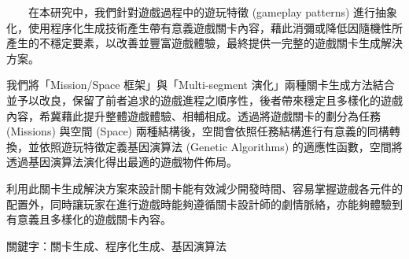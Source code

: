 　　在本研究中，我們針對遊戲過程中的遊玩特徵 (gameplay patterns) 進行抽象化，使用程序化生成技術產生帶有意義遊戲關卡內容，藉此消彌或降低因隨機性所產生的不穩定要素，以改善並豐富遊戲體驗，最終提供一完整的遊戲關卡生成解決方案。

我們將「Mission/Space 框架」與「Multi-segment 演化」兩種關卡生成方法結合並予以改良，保留了前者追求的遊戲進程之順序性，後者帶來穩定且多樣化的遊戲內容，希冀藉此提升整體遊戲體驗、相輔相成。透過將遊戲關卡的劃分為任務 (Missions) 與空間 (Space) 兩種結構後，空間會依照任務結構進行有意義的同構轉換，並依照遊玩特徵定義基因演算法 (Genetic Algorithms) 的適應性函數，空間將透過基因演算法演化得出最適的遊戲物件佈局。

利用此關卡生成解決方案來設計關卡能有效減少開發時間、容易掌握遊戲各元件的配置外，同時讓玩家在進行遊戲時能夠遵循關卡設計師的劇情脈絡，亦能夠體驗到有意義且多樣化的遊戲關卡內容。

關鍵字：關卡生成、程序化生成、基因演算法 